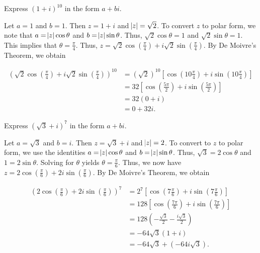 \documentclass[12pt, a4paper]{article}
\begin{document}
 \begin{addmargin}[2.8em]{2.8em}

    Express $(1+i)^{10}$ in the form $a+bi$.

    \vspace{4mm}

    \noindent Let $a=1$ and $b=1$. Then $z=1+i$ and $\abs{z}=\sqrt{2}$. To convert $z$ to polar form, we note that $a=\abs{z}\cos{\theta}$ and $b=\abs{z}\sin{\theta}$. Thus, $\sqrt{2}\cos{\theta}=1$ and $\sqrt{2}\sin{\theta}=1$. This implies that $\theta=\frac{\pi}{4}$. Thus, $z=\sqrt{2}\cos{(\frac{\pi}{4})}+i\sqrt{2}\sin{(\frac{\pi}{4})}$. By De Moivre's Theorem, we obtain

    \begin{equation*}
        \begin{split}
            (\sqrt{2}\cos{(\frac{\pi}{4})}+i\sqrt{2}\sin{(\frac{\pi}{4})})^{10}& =(\sqrt{2})^{10}[\cos{(10\frac{\pi}{4})}+i\sin{(10\frac{\pi}{4})}] \\
            & =32[\cos{(\frac{5\pi}{2})}+i\sin{(\frac{5\pi}{2})}] \\
            & =32(0+i) \\
            & = 0+32i.
        \end{split}
    \end{equation*}
    
    \vspace{2mm}
    
    \noindent Express $(\sqrt{3}+i)^7$ in the form $a+bi$.
    
    \vspace{4mm}
    
    \noindent Let $a=\sqrt{3}$ and $b=i$. Then $z=\sqrt{3}+i$ and $\abs{z}=2$. To convert to $z$ to polar form, we use the identities $a=\abs{z}\cos{\theta}$ and $b=\abs{z}\sin{\theta}$. Thus, $\sqrt{3}=2\cos{\theta}$ and $1=2\sin{\theta}$. Solving for $\theta$ yields $\theta=\frac{\pi}{6}$. Thus, we now have $z=2\cos{(\frac{\pi}{6})}+2i\sin{(\frac{\pi}{6})}$. By De Moivre's Theorem, we obtain
    
    \begin{equation*}
        \begin{split}
            (2\cos{(\frac{\pi}{6})}+2i\sin{(\frac{\pi}{6})})^7& =2^7[\cos{(7\frac{\pi}{6})}+i\sin{(7\frac{\pi}{6})}] \\
            & =128[\cos{(\frac{7\pi}{6})}+i\sin{(\frac{7\pi}{6})}] \\
            & =128(-\frac{\sqrt{3}}{2}-\frac{i\sqrt{3}}{2}) \\
            & =-64\sqrt{3}(1+i) \\
            & =-64\sqrt{3}+(-64i\sqrt{3}).
        \end{split}
    \end{equation*}
    

\end{addmargin}
\end{document}
